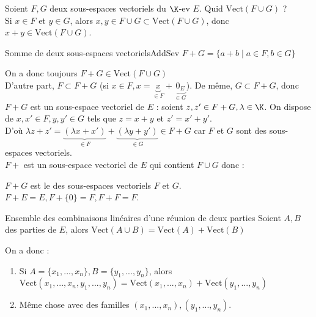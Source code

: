 \documentclass[12pt, a4paper]{report}
\begin{document}
\begin{remarque}{}
Soient $F,G$ deux sous-espaces vectoriels du $\K$-ev $E$. Quid $\text{Vect}(F \cup G)$ ? \\
Si $x \in F$ et $y \in G$, alors $x,y \in F \cup G \subset \text{Vect}(F \cup G)$, donc $x+y \in \text{Vect}(F \cup G)$.

\begin{definition}{Somme de deux sous-espaces vectoriels}{AddSev}
$F+G = \{a+b \mid a \in F, b \in G\}$
\end{definition}

On a donc toujours $F+G \in \text{Vect}(F \cup G)$ \\
D'autre part, $F \subset F+G$ (si $x \in F, x = \underbrace{x}_{\in F}+\underbrace{0_E}_{\in G}$). De même, $G \subset F +G$, donc  \\
$F+G$ est un sous-espace vectoriel de $E$ : soient $z,z' \in F+G, \lambda \in \K$. On dispose de $x,x' \in F, y,y' \in G$ tels que $z=x+y$ et $z' = x'+y'$. \\
D'où $\lambda z + z' = \underbrace{(\lambda x + x')}_{\in F} + \underbrace{(\lambda y + y')}_{\in G} \in F + G$ car $F$ et $G$ sont des sous-espaces vectoriels. \\
$F+$ est un sous-espace vectoriel de $E$ qui contient $F \cup G$ donc :  \\
\begin{remarque}[Vocabulaire]{}
$F+G$ est le  des sous-espaces vectoriels $F$ et $G$. \\
$F+E = E, F + \{0\} = F, F+F = F$.
\end{remarque}

\begin{proposition}{Ensemble des combinaisons linéaires d'une réunion de deux parties}{}
Soient $A,B$ des parties de $E$, alors $\text{Vect}(A \cup B) = \text{Vect}(A) + \text{Vect}(B)$
\end{proposition}

On a donc : 
\begin{enumerate}
	\item Si $A = \{x_1,...,x_n \}, B = \{y_1,...,y_n\}$, alors $\text{Vect}(x_1,...,x_n,y_1,...,y_n) = \text{Vect}(x_1,...,x_n) + \text{Vect}(y_1,...,y_n)$
	\item Même chose avec des familles $(x_1,...,x_n),(y_1,...,y_n)$.
\end{enumerate}


\end{remarque}
\end{document}
